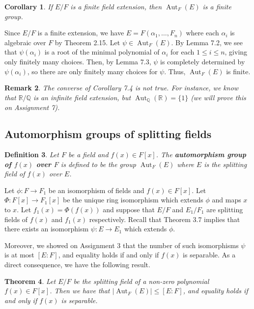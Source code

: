 \documentclass[10pt]{article}
\makeatletter
\newcommand{\R}{\mathbb{R}}
\newcommand{\Q}{\mathbb{Q}}
\DeclareMathOperator{\Aut}{Aut}
\theoremstyle{newstyle}
\newtheorem{thm}{Theorem}[section]
\newtheorem{cor}[thm]{Corollary}
\newtheorem{remark}[thm]{Remark}
\newtheorem{defn}[thm]{Definition}
\newenvironment{pf}[1][\proofname]{\par
  \pushQED{\qed}%
  \normalfont \topsep0\p@\relax
  \trivlist
  \item[\hskip\labelsep\scshape
  #1\@addpunct{.}]\ignorespaces
}{%
  \popQED\endtrivlist\@endpefalse
}
\makeatother
\begin{document}
\begin{cor}
If $E/F$ is a finite field extension, then $\Aut_F(E)$ is a finite group. 
\end{cor}
\begin{pf}
Since $E/F$ is a finite extension, we have $E = F(\alpha_1, \dots, F_n)$ where each 
$\alpha_i$ is algebraic over $F$ by Theorem 2.15. Let $\psi \in \Aut_F(E)$. 
By Lemma 7.2, we see that $\psi(\alpha_i)$ is a root of the minimal polynomial of 
$\alpha_i$ for each $1 \leq i \leq n$, giving only finitely many choices. Then, by 
Lemma 7.3, $\psi$ is completely determined by $\psi(\alpha_i)$, so there are only finitely 
many choices for $\psi$. Thus, $\Aut_F(E)$ is finite. 
\end{pf}

\begin{remark}
The converse of Corollary 7.4 is not true. For instance, we know that $\R/\Q$ is an infinite field 
extension, but $\Aut_{\Q}(\R) = \{1\}$ (we will prove this on Assignment 7).
\end{remark}

\subsection{Automorphism groups of splitting fields}

\begin{defn}
Let $F$ be a field and $f(x) \in F[x]$. The {\bf automorphism group of $f(x)$ over $F$} is 
defined to be the group $\Aut_F(E)$ where $E$ is the splitting field of $f(x)$ over $E$. 
\end{defn}

Let $\phi : F \to F_1$ be an isomorphism of fields and $f(x) \in F[x]$. Let $\Phi : F[x] 
\to F_1[x]$ be the unique ring isomorphism which extends $\phi$ and maps $x$ to $x$. 
Let $f_1(x) = \Phi(f(x))$ and suppose that $E/F$ and $E_1/F_1$ are splitting fields of 
$f(x)$ and $f_1(x)$ respectively. Recall that Theorem 3.7 implies that there 
exists an isomorphism $\psi : E \to E_1$ which extends $\phi$. 

Moreover, we showed on Assignment 3 that the number of such isomorphisms $\psi$ is at most 
$[E : F]$, and equality holds if and only if $f(x)$ is separable. As a direct consequence, 
we have the following result. 

\begin{thm}
Let $E/F$ be the splitting field of a non-zero polynomial $f(x) \in F[x]$. Then we have that
$\lvert\Aut_F(E)\rvert \leq [E : F]$, and equality holds if and only if $f(x)$ is separable. 
\end{thm}
\end{document}
